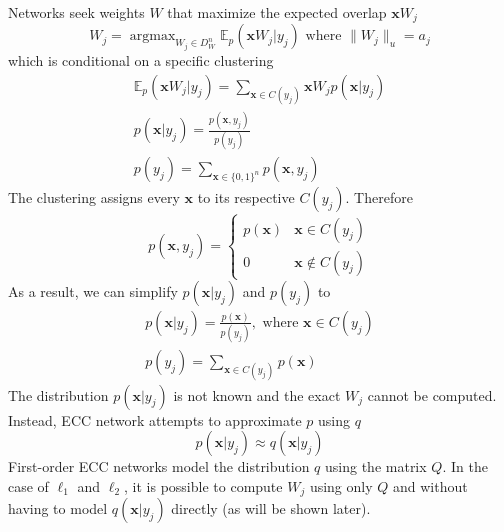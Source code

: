 \documentclass[oneside,english,logo]{amuthesis}
\DeclareMathOperator*{\argmax}{argmax}
\begin{document}
Networks seek weights $W$ that maximize the expected overlap $\boldsymbol{x}W_j$
\[
W_j = \argmax_{W_j\in D_W^{n}} \mathbb{E}_p(\boldsymbol{x}W_j|y_j)\text{ where } \lVert W_j \rVert_u=a_j
\]
which is conditional on a specific clustering
\begin{gather*}
	\mathbb{E}_p(\boldsymbol{x}W_j|y_j) = \sum_{\boldsymbol{x}\in C(y_j)}\boldsymbol{x}W_jp(\boldsymbol{x}|y_j) \\ 
	p(\boldsymbol{x}|y_j) = \frac{p(\boldsymbol{x},y_j)}{p(y_j)} \\
	p(y_j) =  \sum_{\boldsymbol{x}\in \{0,1\}^n}p(\boldsymbol{x},y_j)
\end{gather*}
The clustering assigns every $\boldsymbol{x}$ to its respective $C(y_j)$. Therefore 
\[
p(\boldsymbol{x},y_j) = \begin{cases}
	p(\boldsymbol{x}) & \boldsymbol{x} \in C(y_j) \\
	0 & \boldsymbol{x} \notin C(y_j)
\end{cases}
\]
As a result, we can simplify $p(\boldsymbol{x}|y_j)$ and $p(y_j)$ to
\begin{gather*}
p(\boldsymbol{x}|y_j) = \frac{p(\boldsymbol{x})}{p(y_j)}, \text{ where  }\boldsymbol{x} \in C(y_j)\\
p(y_j) =  \sum_{\boldsymbol{x}\in C(y_j)}p(\boldsymbol{x})
\end{gather*}
The distribution $p(\boldsymbol{x}|y_j)$ is not known and the exact $W_j$ cannot be computed. Instead, ECC network attempts to approximate $p$ using $q$ 
\[
p(\boldsymbol{x}|y_j) \approx q(\boldsymbol{x}|y_j)
\]
First-order ECC networks model the distribution $q$ using the matrix $Q$. 
In the case of $\ell_1$ and $\ell_2$, it is possible to compute $W_j$ using only  $Q$ and without having to model $q(\boldsymbol{x}|y_j)$ directly (as will be shown later).
\end{document}
